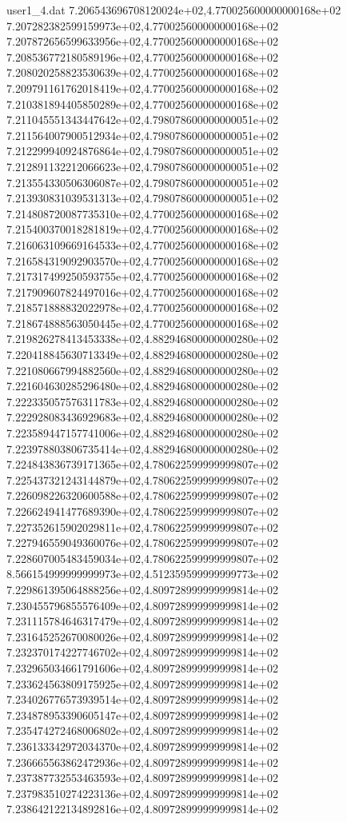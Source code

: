 \begin{filecontents}{user1_4.dat}
7.206543696708120024e+02,4.770025600000000168e+02
7.207282382599159973e+02,4.770025600000000168e+02
7.207872656599633956e+02,4.770025600000000168e+02
7.208536772180589196e+02,4.770025600000000168e+02
7.208020258823530639e+02,4.770025600000000168e+02
7.209791161762018419e+02,4.770025600000000168e+02
7.210381894405850289e+02,4.770025600000000168e+02
7.211045551343447642e+02,4.798078600000000051e+02
7.211564007900512934e+02,4.798078600000000051e+02
7.212299940924876864e+02,4.798078600000000051e+02
7.212891132212066623e+02,4.798078600000000051e+02
7.213554330506306087e+02,4.798078600000000051e+02
7.213930831039531313e+02,4.798078600000000051e+02
7.214808720087735310e+02,4.770025600000000168e+02
7.215400370018281819e+02,4.770025600000000168e+02
7.216063109669164533e+02,4.770025600000000168e+02
7.216584319092903570e+02,4.770025600000000168e+02
7.217317499250593755e+02,4.770025600000000168e+02
7.217909607824497016e+02,4.770025600000000168e+02
7.218571888832022978e+02,4.770025600000000168e+02
7.218674888563050445e+02,4.770025600000000168e+02
7.219826278413453338e+02,4.882946800000000280e+02
7.220418845630713349e+02,4.882946800000000280e+02
7.221080667994882560e+02,4.882946800000000280e+02
7.221604630285296480e+02,4.882946800000000280e+02
7.222335057576311783e+02,4.882946800000000280e+02
7.222928083436929683e+02,4.882946800000000280e+02
7.223589447157741006e+02,4.882946800000000280e+02
7.223978803806735414e+02,4.882946800000000280e+02
7.224843836739171365e+02,4.780622599999999807e+02
7.225437321243144879e+02,4.780622599999999807e+02
7.226098226320600588e+02,4.780622599999999807e+02
7.226624941477689390e+02,4.780622599999999807e+02
7.227352615902029811e+02,4.780622599999999807e+02
7.227946559049360076e+02,4.780622599999999807e+02
7.228607005483459034e+02,4.780622599999999807e+02
8.566154999999999973e+02,4.512359599999999773e+02
7.229861395064888256e+02,4.809728999999999814e+02
7.230455796855576409e+02,4.809728999999999814e+02
7.231115784646317479e+02,4.809728999999999814e+02
7.231645252670080026e+02,4.809728999999999814e+02
7.232370174227746702e+02,4.809728999999999814e+02
7.232965034661791606e+02,4.809728999999999814e+02
7.233624563809175925e+02,4.809728999999999814e+02
7.234026776573939514e+02,4.809728999999999814e+02
7.234878953390605147e+02,4.809728999999999814e+02
7.235474272468006802e+02,4.809728999999999814e+02
7.236133342972034370e+02,4.809728999999999814e+02
7.236665563862472936e+02,4.809728999999999814e+02
7.237387732553463593e+02,4.809728999999999814e+02
7.237983510274223136e+02,4.809728999999999814e+02
7.238642122134892816e+02,4.809728999999999814e+02

\end{filecontents}

